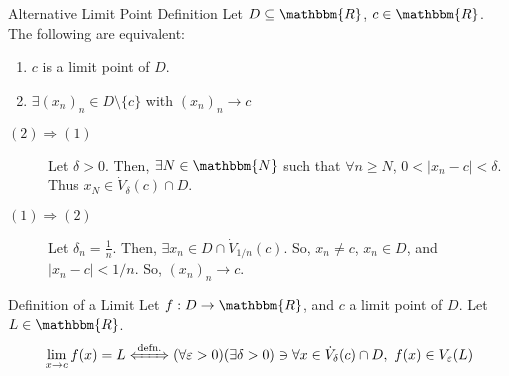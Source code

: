 \documentclass[10pt]{extarticle}
\newcommand{\N}{\mathbbm{N}}
\newcommand{\R}{\mathbbm{R}}
\begin{document}
  \begin{problem}{Alternative Limit Point Definition}
    Let $D\subseteq \R$, $c\in\R$. The following are equivalent:
    \begin{enumerate}[(1)]
      \item $c$ is a limit point of $D$.
      \item $\exists (x_n)_n \in D\setminus \{c\}$ with $(x_n)_n \rightarrow c$
    \end{enumerate}
    \tcblower
    \begin{description}
      \item[$(2) \Rightarrow (1)$] Let $\delta > 0$. Then, $\exists N\in\N$ such that $\forall n\geq N$, $0 < |x_n - c| < \delta$. Thus $x_{N} \in \dot{V}_{\delta}(c) \cap D$.
      \item[$(1) \Rightarrow (2)$] Let $\delta_n = \frac{1}{n}$. Then, $\exists x_n \in D \cap \dot{V}_{1/n}(c)$. So, $x_n \neq c$, $x_n\in D$, and $|x_n - c| < 1/n$. So, $(x_n)_n \rightarrow c$.
    \end{description}
  \end{problem}
  \begin{problem}{Definition of a Limit}
    Let $f: D\rightarrow \R$, and $c$ a limit point of $D$. Let $L \in \R$.
    \begin{align*}
      \lim_{x\rightarrow c} f(x) = L \xLeftrightarrow{\text{defn.}} (\forall \varepsilon > 0)(\exists \delta > 0) \ni \forall x\in \dot{V}_{\delta}(c)\cap D,~f(x)\in V_{\varepsilon}(L)
    \end{align*}
  \end{problem}
\end{document}
